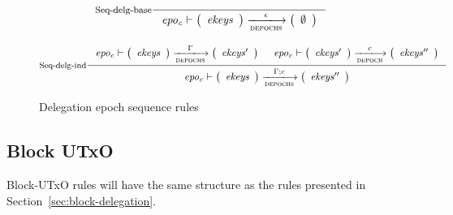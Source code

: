 \begin{figure}
  \begin{equation}
    \inference[Seq-delg-base]
    {}
    { \var{epo_c} \vdash \left(
        \begin{array}{r}
          \var{ekeys}
        \end{array}
      \right)
        \trans{depochs}{\epsilon}
      \left(
        \begin{array}{r}
          \var{\emptyset}
        \end{array}
      \right)
    }
    \label{eq:rule:depoch-sequence-base}
  \end{equation}

  \begin{equation}
    \inference[Seq-delg-ind]
    { \var{epo_c} \vdash
      {\left(
        \begin{array}{r}
          \var{ekeys}
        \end{array}
      \right)}
      \trans{depochs}{\Gamma}
      {\left(
        \begin{array}{r}
          \var{ekeys'}
        \end{array}
      \right)}
    &
    \var{epo_c} \vdash
    {\left(
        \begin{array}{r}
          \var{ekeys'}
        \end{array}
      \right)}
      \trans{depoch}{c}
      {\left(
        \begin{array}{r}
          \var{ekeys''}
        \end{array}
      \right)}
    }
    { \var{epo_c} \vdash \left(
        \begin{array}{r}
          \var{ekeys}
        \end{array}
      \right)
      \trans{depochs}{\Gamma; c}
      \left(
        \begin{array}{r}
          \var{ekeys''}
        \end{array}
      \right)
    }
    \label{eq:rule:depoch-sequence-inductive}
  \end{equation}
  \caption{Delegation epoch sequence rules}
  \label{fig:rules:epoch-sequence}
\end{figure}

\subsection{Block UTxO}
\label{sec:block-utxo}

\begin{todo}
  Block-UTxO rules will have the same structure as the rules presented in
  Section~\ref{sec:block-delegation}.
\end{todo}
